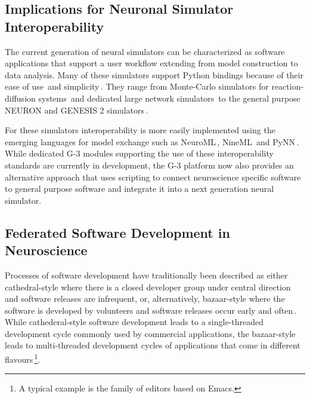 \documentclass[12pt]{article}
\begin{document}




\subsection{Implications for Neuronal Simulator Interoperability}

The current generation of neural simulators can be characterized as
software applications that support a user workflow extending from
model construction to data analysis.  Many of these simulators support
Python bindings because of their ease of use\,\cite{pecevski09:_pcsim}
and simplicity\,\cite{goodman08:_brian}.  They range from Monte-Carlo
simulators for reaction-diffusion systems\,\cite{wils09:_steps} and
dedicated large network simulators\,\cite{eppler08:_pynes} to the
general purpose NEURON and GENESIS 2
simulators\,\cite{hines09:_neuron_python, bower98:_book_genes}.

For these simulators interoperability is more easily implemented using
the emerging languages for model exchange such as
NeuroML\,\cite{nigel01:_towar_neurom},
NineML\,\cite{gortechnikov10:_ninem_user_layer} and
PyNN\,\cite{andrew08:_pynn}.  While dedicated G-3 modules supporting
the use of these interoperability standards are currently in
development, the G-3 platform now also provides an alternative
approach that uses scripting to connect neuroscience specific software
to general purpose software and integrate it into a next generation
neural simulator.

\subsection{Federated Software Development in Neuroscience}

Processes of software development have traditionally been described as
either cathedral-style where there is a closed developer group under
central direction and software releases are infrequent, or,
alternatively, bazaar-style where the software is developed by
volunteers and software releases occur early and
often\,\cite{raymond01:_cathed_bazaar, citeulike:126678}.
While cathederal-style software development leads to a single-threaded
development cycle commonly used by commercial applications, the
bazaar-style leads to multi-threaded development cycles of
applications that come in different flavours\,\footnote{A typical
  example is the family of editors based on Emacs.}.
\end{document}
